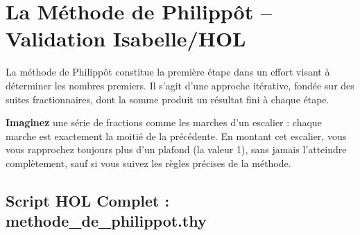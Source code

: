 \documentclass[a4paper,11pt]{article}
\newenvironment{resume}{%
    \begin{tcolorbox}[colback=purple!5,colframe=holpurple,title={\textbf{Résumé visuel}}]
}{%
    \end{tcolorbox}
}
\begin{document}
\section{La Méthode de Philippôt -- Validation Isabelle/HOL}

La méthode de Philippôt constitue la première étape dans un effort visant à déterminer les nombres premiers. Il s'agit d'une approche itérative, fondée sur des suites fractionnaires, dont la somme produit un résultat fini à chaque étape.

\begin{resume}
\textbf{Imaginez} une série de fractions comme les marches d'un escalier : chaque marche est exactement la moitié de la précédente. En montant cet escalier, vous vous rapprochez toujours plus d'un plafond (la valeur 1), sans jamais l'atteindre complètement, sauf si vous suivez les règles précises de la méthode.
\end{resume}

\subsection{Script HOL Complet : methode\_de\_philippot.thy}
\end{document}
